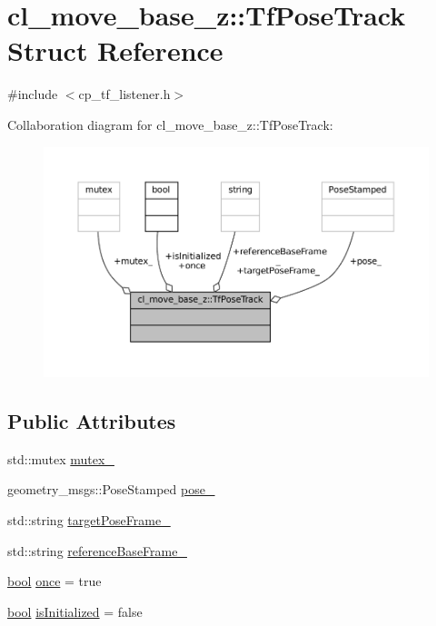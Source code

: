 \hypertarget{structcl__move__base__z_1_1TfPoseTrack}{}\section{cl\+\_\+move\+\_\+base\+\_\+z\+:\+:Tf\+Pose\+Track Struct Reference}
\label{structcl__move__base__z_1_1TfPoseTrack}


{\ttfamily \#include $<$cp\+\_\+tf\+\_\+listener.\+h$>$}



Collaboration diagram for cl\+\_\+move\+\_\+base\+\_\+z\+:\+:Tf\+Pose\+Track\+:
\nopagebreak
\begin{figure}[H]
\begin{center}
\leavevmode
\includegraphics[width=350pt]{structcl__move__base__z_1_1TfPoseTrack__coll__graph}
\end{center}
\end{figure}
\subsection*{Public Attributes}
\begin{DoxyCompactItemize}
\item 
std\+::mutex \hyperlink{structcl__move__base__z_1_1TfPoseTrack_adcc7f5b2efe012138fcaa78b4cb9a171}{mutex\+\_\+}
\item 
geometry\+\_\+msgs\+::\+Pose\+Stamped \hyperlink{structcl__move__base__z_1_1TfPoseTrack_a4ec7517f9a2d808642eaf9fb0ea88808}{pose\+\_\+}
\item 
std\+::string \hyperlink{structcl__move__base__z_1_1TfPoseTrack_a02910828a8320e62cda39c6453ad44ff}{target\+Pose\+Frame\+\_\+}
\item 
std\+::string \hyperlink{structcl__move__base__z_1_1TfPoseTrack_a3042763af6b267cbab9ba0bf2aa1f783}{reference\+Base\+Frame\+\_\+}
\item 
\hyperlink{classbool}{bool} \hyperlink{structcl__move__base__z_1_1TfPoseTrack_a951e6561b20a681a868ec84f916be436}{once} = true
\item 
\hyperlink{classbool}{bool} \hyperlink{structcl__move__base__z_1_1TfPoseTrack_a7af0502b3fb73556c387fa04ff8a1d9a}{is\+Initialized} = false
\end{DoxyCompactItemize}


